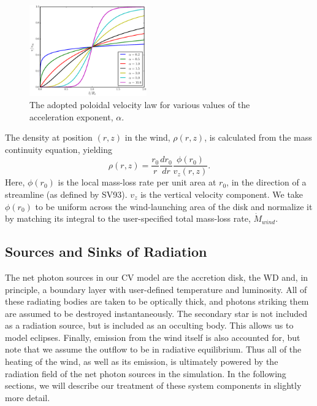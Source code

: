 \documentclass[preprint, a4paper, 11pt]{aastex}
\begin{document}
\begin{figure}
\centering
\includegraphics[width=0.45\textwidth]{figures/acc_law.eps}
\caption{
The adopted poloidal velocity law for various values of the
acceleration exponent, $\alpha$.
} 
\label{acc_law}
\end{figure}

The density at position $(r,z)$ in the wind, $\rho(r,z)$, is
calculated from the mass continuity equation, yielding
\begin{equation}
\rho(r,z) = \frac{r_0}{r} \frac{dr_0}{dr} \frac{\phi(r_0)}{v_z(r,z)}.
\label{density}
\end{equation}
Here, $\phi(r_0)$ is the local mass-loss rate per unit area at $r_0$, in the direction 
of a streamline (as defined by SV93). 
$v_z$ is the vertical velocity component. We take $\phi(r_0)$ to be
uniform across the wind-launching area of the disk and normalize it by
matching its integral to the user-specified total mass-loss rate,
$\dot{M}_{wind}$. 

\subsection{Sources and Sinks of Radiation}
\label{radsources}

The net photon sources in our CV model are the accretion disk, the
WD and, in principle, a boundary layer with user-defined temperature
and luminosity. All of these radiating bodies are taken to be
optically thick, and photons striking them are assumed to be destroyed
instantaneously. The secondary star is not included as a radiation
source, but is included as an occulting body. This allows us to model
eclipses. Finally, emission from the wind itself is also accounted for, but
note that we assume the outflow to be in radiative equilibrium. Thus all
of the heating of the wind, as well as its emission, is ultimately
powered by the radiation field of the net photon sources in the
simulation. In the following sections, we will describe our treatment
of these system components in slightly more detail.
\end{document}
